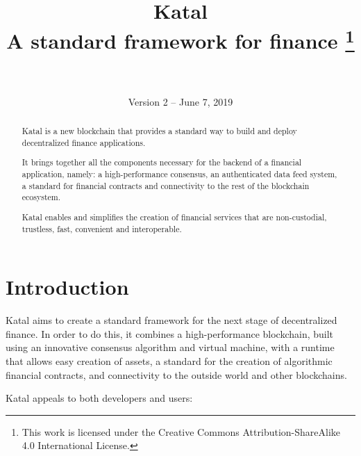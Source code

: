 \documentclass[conference]{IEEEtran}
\begin{document}
\title{Katal\\
	\large A standard framework for finance
	\thanks{This work is licensed under the Creative Commons Attribution-ShareAlike 4.0 International License.}
}

\author{
	\\\\Version 2 -- June 7, 2019
}

\maketitle
\thispagestyle{plain} %
\pagestyle{plain} %

\begin{abstract}
Katal is a new blockchain that provides a standard way to build and deploy decentralized finance applications.

It brings together all the components necessary for the backend of a financial application, namely: a high-performance consensus, an authenticated data feed system, a standard for financial contracts and connectivity to the rest of the blockchain ecosystem.

Katal enables and simplifies the creation of financial services that are non-custodial, trustless, fast, convenient and interoperable.

\end{abstract}

\section{Introduction}
Katal aims to create a standard framework for the next stage of decentralized finance. In order to do this, it combines a high-performance blockchain, built using an innovative consensus algorithm and virtual machine, with a runtime that allows easy creation of assets, a standard for the creation of algorithmic financial contracts, and connectivity to the outside world and other blockchains.

Katal appeals to both developers and users:
\end{document}
